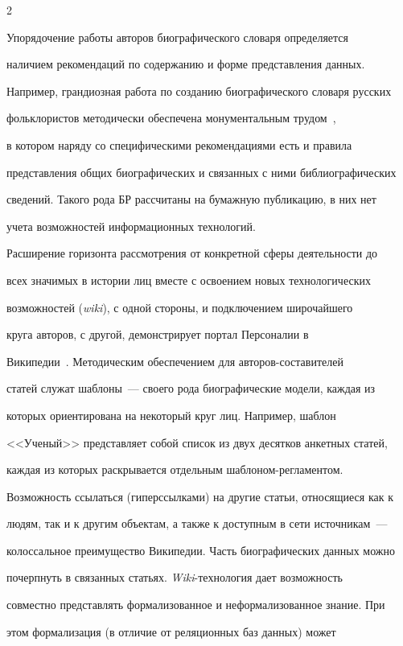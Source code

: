 \begin{multicols}{2}
  


  Упорядочение работы авторов биографического словаря определяется 


наличием рекомендаций по содержанию и форме представления данных. 


Например, грандиозная работа по созданию биографического словаря русских 


фольклористов методически обеспечена монументальным трудом~\cite{5mar}, 


в котором наряду со специфическими рекомендациями есть и правила 


представления общих биографических и связанных с ними библиографических 


сведений. Такого рода БР рассчитаны на бумажную публикацию, в них нет 


учета возможностей информационных технологий.


  


  Расширение горизонта рассмотрения от конкретной сферы деятельности до 


всех значимых в истории лиц вместе с освоением новых технологических 


возможностей (\textit{wiki}), с одной стороны, и подключением широчайшего 


круга авторов, с другой, демонстрирует портал Персоналии в 


Википедии~\cite{6mar}. Методическим обеспечением для ав\-то\-ров-со\-ста\-ви\-те\-лей 


статей служат шаблоны~--- своего рода биографические модели, каждая из 


которых ориентирована на некоторый круг лиц. Например, шаблон 


<<Ученый>> представляет собой список из двух десятков анкетных статей, 


каждая из которых раскрывается отдельным шаблоном-регламентом. 


Возможность ссылаться (гиперссылками) на другие статьи, относящиеся как к 


людям, так и к другим объектам, а также к доступным в сети источникам~--- 


колоссальное преимущество Википедии. Часть биографических данных можно 


почерпнуть в связанных статьях. \textit{Wiki}-технология дает возможность 


совместно представлять формализованное и неформализованное знание. При 


этом формализация (в отличие от реляционных баз данных) может\linebreak 



\end{multicols}
